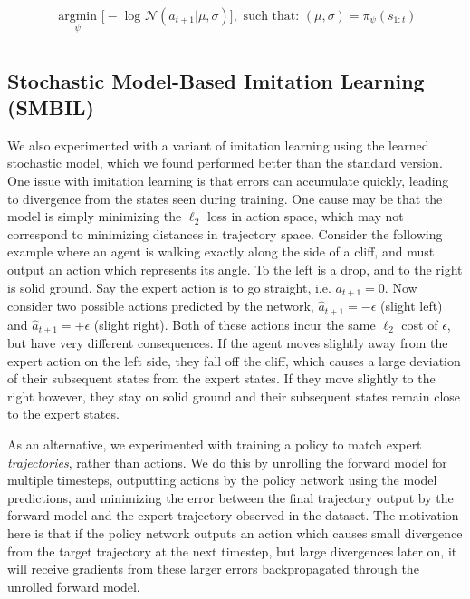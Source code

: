 \documentclass{article} %
\begin{document}
    \begin{align*}
    \underset{\psi}{\mbox{ argmin }} \Big[ -\mbox{ log } \mathcal{N}(a_{t+1} | \mu, \sigma) \Big],  \mbox{ such that: } (\mu, \sigma) = \pi_\psi(s_{1:t}) \\
  \end{align*}

  \subsection{Stochastic Model-Based Imitation Learning (SMBIL)}

  We also experimented with a variant of imitation learning using the learned stochastic model, which we found performed better than the standard version. One issue with imitation learning is that errors can accumulate quickly, leading to divergence from the states seen during training.
  One cause may be that the model is simply minimizing the $\ell_2$ loss in action space, which may not correspond to minimizing distances in trajectory space.
  Consider the following example where an agent is walking exactly along the side of a cliff, and must output an action which represents its angle.
  To the left is a drop, and to the right is solid ground.
  Say the expert action is to go straight, i.e. $a_{t+1} = 0$. Now consider two possible actions predicted by the network, $\hat{a}_{t+1} = -\epsilon$ (slight left) and $\hat{a}_{t+1} = +\epsilon$ (slight right).
  Both of these actions incur the same $\ell_2$ cost of $\epsilon$, but have very different consequences. If the agent moves slightly away from the expert action on the left side, they fall off the cliff, which causes a large deviation of their subsequent states from the expert states. If they move slightly to the right however, they stay on solid ground and their subsequent states remain close to the expert states.

  As an alternative, we experimented with training a policy to match expert \textit{trajectories}, rather than actions.
  We do this by unrolling the forward model for multiple timesteps, outputting actions by the policy network using the model predictions, and minimizing the error between the final trajectory output by the forward model and the expert trajectory observed in the dataset.
  The motivation here is that if the policy network outputs an action which causes small divergence from the target trajectory at the next timestep, but large divergences later on, it will receive gradients from these larger errors backpropagated through the unrolled forward model.
\end{document}
